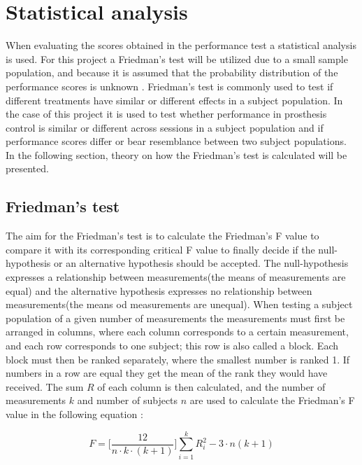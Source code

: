 \section{Statistical analysis}
When evaluating the scores obtained in the performance test a statistical analysis is used. For this project a Friedman's test will be utilized due to a small sample population, and because it is assumed that the probability distribution of the performance scores is unknown \cite{Zar2009}. Friedman's test is commonly used to test if different treatments have similar or different effects in a subject population. In the case of this project it is used to test whether performance in prosthesis control is similar or different across sessions in a subject population and if performance scores differ or bear resemblance between two subject populations. In the following section, theory on how the Friedman's test is calculated will be presented.

\subsection{Friedman's test}
The aim for the Friedman's test is to calculate the Friedman's F value to compare it with its corresponding critical F value to finally decide if the null-hypothesis or an alternative hypothesis should be accepted. The null-hypothesis expresses a relationship between measurements(the means of measurements are equal) and the alternative hypothesis expresses no relationship between measurements(the means od measurements are unequal).
When testing a subject population of a given number of measurements the measurements must first be arranged in columns, where each column corresponds to a certain measurement, and each row corresponds to one subject; this row is also called a block. Each block must then be ranked separately, where the smallest number is ranked 1. If numbers in a row are equal they get the mean of the rank they would have received. The sum $R$ of each column is then calculated, and the number of measurements $k$ and number of subjects $n$ are used to calculate the Friedman's F value in the following equation \cite{Zar2009}:

\begin{equation}
	F = \Big[\frac{12}{n \cdot k \cdot (k+1)}\Big] \sum_{i=1}^{k} R_{i}^{2} - 3 \cdot n(k + 1)
\end{equation}

